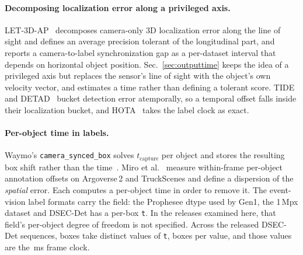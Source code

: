 \documentclass[10pt,twocolumn,letterpaper]{article}
\begin{document}
\paragraph{Decomposing localization error along a privileged axis.}
LET-3D-AP~\cite{hung2022let} decomposes camera-only 3D localization error along
the line of sight and defines an average precision tolerant of the longitudinal
part, and reports a camera-to-label synchronization gap as a per-dataset interval
that depends on horizontal object position. Sec.~\ref{sec:outputtime} keeps the
idea of a privileged axis but replaces the sensor's line of sight with the
object's own velocity vector, and estimates a time rather than defining a
tolerant score.
TIDE~\cite{bolya2020tide,hoiem2012diagnosing} and DETAD~\cite{alwassel2018detad}
bucket detection error atemporally, so a temporal offset falls inside their
localization bucket, and HOTA~\cite{luiten2021hota} takes the label clock as
exact.

\paragraph{Per-object time in labels.} Waymo's \texttt{camera\_synced\_box} solves
$t_{\mathrm{capture}}$ per object and stores the resulting box shift rather than
the time~\cite{waymolabelproto,sun2020waymo}. Miro et
al.~\cite{nunez2026annotations} measure within-frame per-object annotation
offsets on Argoverse\,2 and TruckScenes and define a dispersion of the
\emph{spatial} error. Each computes a per-object time in order to remove it. The
event-vision label formats carry the field: the Prophesee dtype used by Gen1, the
1\,Mpx dataset and DSEC-Det has a per-box \texttt{t}. In the releases examined
here, that field's per-object degree of freedom is not specified. Across the \ddSeqs{} released DSEC-Det
sequences, \ddBoxes{} boxes take \ddDistinctT{} distinct values of \texttt{t},
\ddBoxesPerT{} boxes per value, and those values are the \dsecFramePeriod\,ms
frame clock.
\end{document}
